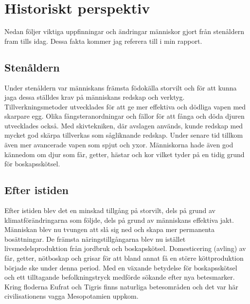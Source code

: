 \section{Historiskt perspektiv}
Nedan följer viktiga uppfinningar och ändringar människor gjort från stenåldern fram tills idag. Dessa fakta kommer jag referera till i min rapport. 
 
\subsection{Stenåldern}
Under stenåldern var människans främsta födokälla storvilt och för att kunna jaga dessa ställdes krav på människans redskap och verktyg. Tillverkningsmetoder utvecklades för att ge mer effektiva och dödliga vapen med skarpare egg. Olika fångsteranordningar och fällor för att fånga och döda djuren utvecklades också. Med skivtekniken, där avslagen används, kunde redskap med mycket god skärpa tillverkas som sågliknande redskap. Under senare tid tillkom även mer avancerade vapen som spjut och yxor. \citep{denskapande} 
\newline
\newline
Människorna hade även god kännedom om djur som får, getter, hästar och kor vilket tyder på en tidig grund för boskapsskötsel. \citep{denskapande}
     
\subsection{Efter istiden}
Efter istiden blev det en minskad tillgång på storvilt, dels på grund av klimatförändringarna som följde, dels på grund av människans effektiva jakt. Människan blev nu tvungen att slå sig ned och skapa mer permanenta bosättningar. De främsta näringstillgångarna blev nu istället livsmedelsproduktion från jordbruk och boskapskötsel. Domesticering (avling) av får, getter, nötboskap och grisar för att bland annat få en större köttproduktion började ske under denna period. \citep{denskapande}
\newline
\newline
Med en växande betydelse för boskapsskötsel och ett tilltagande befolkningstryck medförde sökande efter nya betesmarker. Kring floderna Eufrat och Tigris finns naturliga betesområden och det var här civilisationens vagga Mesopotamien uppkom. \citep{denskapande}   

